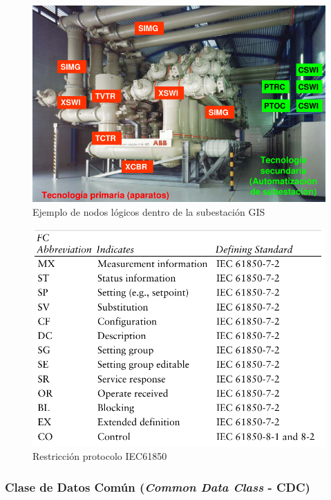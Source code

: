 \documentclass[a5paper]{book}%
\begin{document}
\begin{figure}[H]
  \centering
  \caption{Ejemplo de nodos lógicos dentro de la subestación GIS }
  \label{fig:ln_example}
  \includegraphics[width=\linewidth]{ln_example}
\end{figure}


  
  \begin{figure}[H]
  \centering
  \caption{Restricción protocolo IEC61850}
  \label{fig:iec61850resticcion}
  \includegraphics[width=\linewidth]{restricciones}
\end{figure}

\subsubsection{Clase de Datos Común (\textit{Common Data Class} - CDC)}
\end{document}
